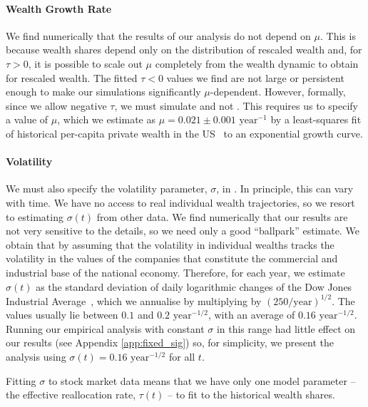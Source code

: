 \paragraph{Wealth Growth Rate}

We find numerically that the results of our analysis do not depend on $\mu$. This is because wealth shares depend only on the distribution of rescaled wealth and, for $\tau>0$, it is possible to scale out $\mu$ completely from the wealth dynamic to obtain  for rescaled wealth. The fitted $\tau<0$ values we find are not large or persistent enough to make our simulations significantly $\mu$-dependent. However, formally, since we allow negative $\tau$, we must simulate  and not . This requires us to specify a value of $\mu$, which we estimate as $\mu=0.021\pm 0.001 \text{ year}^{-1}$ by a least-squares fit of historical per-capita private wealth in the US~\cite{PikettyZucman2014} to an exponential growth curve.

\paragraph{Volatility}

We must also specify the volatility parameter, $\sigma$, in . In principle, this can vary with time. We have no access to real individual wealth trajectories, so we resort to estimating $\sigma\left(t\right)$ from other data. We find numerically that our results are not very sensitive to the details, so we need only a good ``ballpark'' estimate. We obtain that by assuming that the volatility in individual wealths tracks the volatility in the values of the companies that constitute the commercial and industrial base of the national economy. Therefore, for each year, we estimate $\sigma\left(t\right)$ as the standard deviation of daily logarithmic changes of the Dow Jones Industrial Average~\cite{Quandl2016}, which we annualise by multiplying by $\left(250/\text{year}\right)^{1/2}$. The values usually lie between $0.1$ and $0.2 \text{ year}^{-1/2}$, with an average of $0.16\text{ year}^{-1/2}$. Running our empirical analysis with constant $\sigma$ in this range had little effect on our results (see Appendix \ref{app:fixed_sig}) so, for simplicity, we present the analysis using $\sigma\left(t\right)=0.16\text{ year}^{-1/2}$ for all $t$.

Fitting $\sigma$ to stock market data means that we have only one model parameter -- the effective reallocation rate, $\tau\left(t\right)$ -- to fit to the historical wealth shares.

